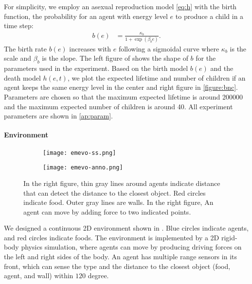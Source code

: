 For simplicity, we employ an asexual reproduction model \cref{eq:h} with the birth function, the probability for an agent with energy level $e$ to produce a child in a time step:
\begin{align}
 b(e) &= \frac{\kappa_{b}}{1 + \exp(\beta_{b}e)}.
 \label{eq:b}
\end{align}
The birth rate $b(e)$ increases with $e$ following a sigmoidal curve where $\kappa_{b}$ is the scale and $\beta_{b}$ is the slope.
The left figure of  shows the shape of $b$ for the parameters used in the experiment.
Based on the birth model $b(e)$ and the death model $h(e,t)$, we plot the expected lifetime and number of children if an agent keeps the same energy level in the center and right figure in \cref{figure:bnc}. Parameters are chosen so that the maximum expected lifetime is around \num{200000} and the maximum expected number of children is around 40. All experiment parameters are shown in \cref{ap:param}.

\paragraph{Environment}

\begin{figure}[t]
  \begin{subfigure}[t]{6cm}
    \centering
    \texttt{[image: emevo-ss.png]}
  \end{subfigure}
  \begin{subfigure}[t]{8cm}
    \centering
    \texttt{[image: emevo-anno.png]}
  \end{subfigure}
  \caption{
    In the right figure, thin gray lines around agents indicate distance that can detect the distance to the closest object. Red circles indicate food. Outer gray lines are walls.
    In the right figure, An agent can move by adding force to two indicated points.
  }\label{figure:env}
\end{figure}

We designed a continuous 2D environment shown in . Blue circles indicate agents, and red circles indicate foods. The environment is implemented by a 2D rigid-body physics simulation, where agents can move by producing driving forces on the left and right sides of the body.
An agent has multiple range sensors in its front, which can sense the type and the distance to the closest object (food, agent, and wall) within $120$ degree.

